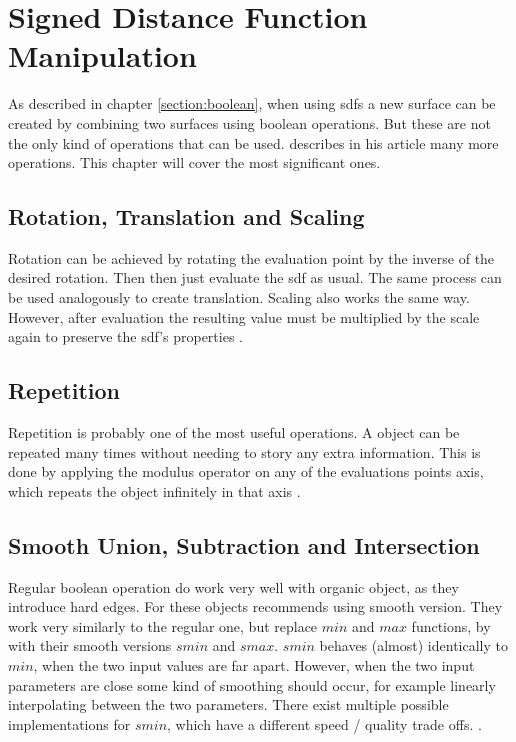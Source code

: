 \section{Signed Distance Function Manipulation}
As described in chapter \ref{section:boolean}, when using \glspl{sdf} a new surface can be created by combining two surfaces using boolean operations. But these are not the only kind of operations that can be used. \textcite{quilez:2008:distfunctions} describes in his article many more operations. This chapter will cover the most significant ones.

\subsection{Rotation, Translation and Scaling}
Rotation can be achieved by rotating the evaluation point by the inverse of the desired rotation. Then then just evaluate the \gls{sdf} as usual. The same process can be used analogously to create translation. Scaling also works the same way. However, after evaluation the resulting value must be multiplied by the scale again to preserve the \gls{sdf}'s properties \cite{quilez:2008:distfunctions}.

\subsection{Repetition}
Repetition is probably one of the most useful operations. A object can be repeated many times without needing to story any extra information. This is done by applying the modulus operator on any of the evaluations points axis, which repeats the object infinitely in that axis \cite{quilez:2008:distfunctions}.

\subsection{Smooth Union, Subtraction and Intersection}
Regular boolean operation do work very well with organic object, as they introduce hard edges. For these objects  \textcite{quilez:2008:distfunctions} recommends using smooth version. They work very similarly to the regular one, but replace $min$ and $max$ functions, by with their smooth versions $smin$ and $smax$. $smin$ behaves (almost) identically to $min$, when the two input values are far apart. However, when the two input parameters are close some kind of smoothing should occur, for example linearly interpolating between the two parameters. There exist multiple possible implementations for $smin$, which have a different speed / quality trade offs. 
\cite{quilez:2008:distfunctions}\cite{quilez:2008:smoothmin}.


